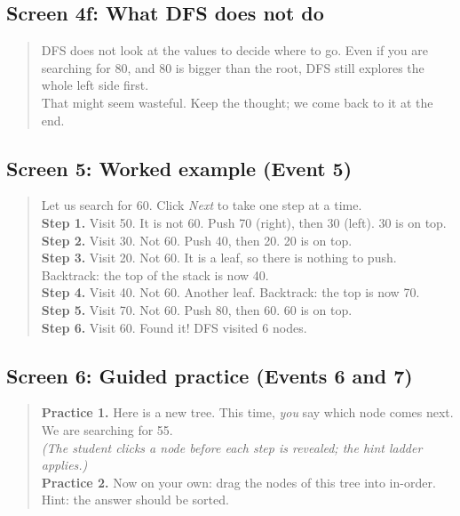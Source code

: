 \documentclass[11pt,a4paper]{article}
\begin{document}
\subsection*{Screen 4f: What DFS does not do}
\begin{quote}\sffamily\small
DFS does not look at the values to decide where to go. Even if you are searching for 80, and 80 is
bigger than the root, DFS still explores the whole left side first.\\[2pt]
That might seem wasteful. Keep the thought; we come back to it at the end.
\end{quote}

\subsection*{Screen 5: Worked example (Event 5)}
\begin{quote}\sffamily\small
Let us search for 60. Click \emph{Next} to take one step at a time.\\
\textbf{Step 1.} Visit 50. It is not 60. Push 70 (right), then 30 (left). 30 is on top.\\
\textbf{Step 2.} Visit 30. Not 60. Push 40, then 20. 20 is on top.\\
\textbf{Step 3.} Visit 20. Not 60. It is a leaf, so there is nothing to push. Backtrack: the top of
the stack is now 40.\\
\textbf{Step 4.} Visit 40. Not 60. Another leaf. Backtrack: the top is now 70.\\
\textbf{Step 5.} Visit 70. Not 60. Push 80, then 60. 60 is on top.\\
\textbf{Step 6.} Visit 60. Found it! DFS visited 6 nodes.
\end{quote}

\subsection*{Screen 6: Guided practice (Events 6 and 7)}
\begin{quote}\sffamily\small
\textbf{Practice 1.} Here is a new tree. This time, \emph{you} say which node comes next. We are
searching for 55.\\
\emph{(The student clicks a node before each step is revealed; the hint ladder applies.)}\\[4pt]
\textbf{Practice 2.} Now on your own: drag the nodes of this tree into in-order. Hint: the answer
should be sorted.
\end{quote}
\end{document}
